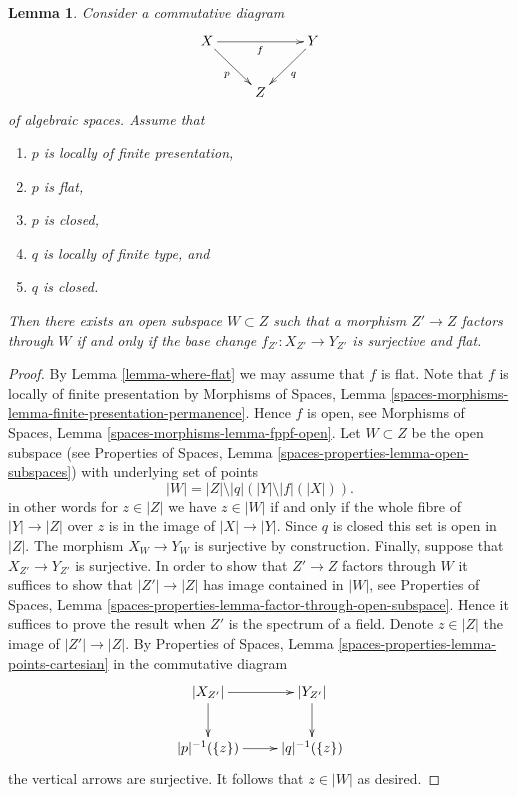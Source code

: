 \documentclass[10pt,a4paper]{amsart}
\theoremstyle{plain}
\newtheorem{lemma}[subsection]{Lemma}
\theoremstyle{definition}
\theoremstyle{remark}
\numberwithin{equation}{subsection}
\begin{document}
\begin{lemma}
\label{lemma-where-surjective-flat}
Consider a commutative diagram
$$
\xymatrix{
X \ar[rr]_f \ar[rd]_p & & Y \ar[ld]^q \\
& Z
}
$$
of algebraic spaces. Assume that
\begin{enumerate}
\item $p$ is locally of finite presentation,
\item $p$ is flat,
\item $p$ is closed,
\item $q$ is locally of finite type, and
\item $q$ is closed.
\end{enumerate}
Then there exists an open subspace $W \subset Z$
such that a morphism $Z' \to Z$ factors through $W$ if and only if the
base change $f_{Z'} : X_{Z'} \to Y_{Z'}$ is surjective and flat.
\end{lemma}

\begin{proof}
By
Lemma \ref{lemma-where-flat}
we may assume that $f$ is flat.
Note that $f$ is locally of finite presentation by
Morphisms of Spaces,
Lemma \ref{spaces-morphisms-lemma-finite-presentation-permanence}.
Hence $f$ is open, see
Morphisms of Spaces, Lemma \ref{spaces-morphisms-lemma-fppf-open}.
Let $W \subset Z$ be the open subspace (see
Properties of Spaces, Lemma
\ref{spaces-properties-lemma-open-subspaces})
with underlying set of points
$$
|W| = |Z| \setminus |q|\left(|Y| \setminus |f|(|X|)\right).
$$
in other words for $z \in |Z|$ we have $z \in |W|$ if and only
if the whole fibre of $|Y| \to |Z|$ over $z$ is in the image of
$|X| \to |Y|$. Since $q$ is closed this set is open in $|Z|$.
The morphism $X_W \to Y_W$ is surjective by construction.
Finally, suppose that $X_{Z'} \to Y_{Z'}$ is surjective.
In order to show that $Z' \to Z$ factors through $W$ it suffices to show
that $|Z'| \to |Z|$ has image contained in $|W|$, see
Properties of Spaces, Lemma
\ref{spaces-properties-lemma-factor-through-open-subspace}.
Hence it suffices to prove the result when $Z'$ is the spectrum of a field.
Denote $z \in |Z|$ the image of $|Z'| \to |Z|$. By
Properties of Spaces,
Lemma \ref{spaces-properties-lemma-points-cartesian}
in the commutative diagram
$$
\xymatrix{
|X_{Z'}| \ar[d] \ar[r] &
|Y_{Z'}| \ar[d] \\
|p|^{-1}(\{z\}) \ar[r] &
|q|^{-1}(\{z\})
}
$$
the vertical arrows are surjective. It follows that $z \in |W|$ as desired.
\end{proof}
\end{document}
